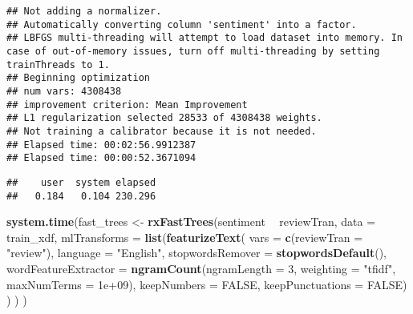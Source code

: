 \documentclass[]{book}
\newenvironment{Shaded}{\begin{snugshade}}{\end{snugshade}}
\newcommand{\KeywordTok}[1]{\textcolor[rgb]{0.13,0.29,0.53}{\textbf{#1}}}
\newcommand{\DataTypeTok}[1]{\textcolor[rgb]{0.13,0.29,0.53}{#1}}
\newcommand{\DecValTok}[1]{\textcolor[rgb]{0.00,0.00,0.81}{#1}}
\newcommand{\FloatTok}[1]{\textcolor[rgb]{0.00,0.00,0.81}{#1}}
\newcommand{\StringTok}[1]{\textcolor[rgb]{0.31,0.60,0.02}{#1}}
\newcommand{\OtherTok}[1]{\textcolor[rgb]{0.56,0.35,0.01}{#1}}
\newcommand{\OperatorTok}[1]{\textcolor[rgb]{0.81,0.36,0.00}{\textbf{#1}}}
\newcommand{\NormalTok}[1]{#1}
\theoremstyle{definition}
\theoremstyle{definition}
\theoremstyle{definition}
\theoremstyle{remark}
\begin{document}
\begin{verbatim}
## Not adding a normalizer.
## Automatically converting column 'sentiment' into a factor.
## LBFGS multi-threading will attempt to load dataset into memory. In case of out-of-memory issues, turn off multi-threading by setting trainThreads to 1.
## Beginning optimization
## num vars: 4308438
## improvement criterion: Mean Improvement
## L1 regularization selected 28533 of 4308438 weights.
## Not training a calibrator because it is not needed.
## Elapsed time: 00:02:56.9912387
## Elapsed time: 00:00:52.3671094
\end{verbatim}

\begin{verbatim}
##    user  system elapsed 
##   0.184   0.104 230.296
\end{verbatim}

\begin{Shaded}
\begin{Highlighting}[]
\KeywordTok{system.time}\NormalTok{(fast_trees <-}\StringTok{ }\KeywordTok{rxFastTrees}\NormalTok{(sentiment }\OperatorTok{~}\StringTok{ }\NormalTok{reviewTran,}
                                       \DataTypeTok{data =}\NormalTok{ train_xdf,}
                                       \DataTypeTok{mlTransforms =} 
                                                  \KeywordTok{list}\NormalTok{(}\KeywordTok{featurizeText}\NormalTok{(}
                                                    \DataTypeTok{vars =} \KeywordTok{c}\NormalTok{(}\DataTypeTok{reviewTran =} \StringTok{"review"}\NormalTok{),}
                                                    \DataTypeTok{language =} \StringTok{"English"}\NormalTok{,}
                                                    \DataTypeTok{stopwordsRemover =} \KeywordTok{stopwordsDefault}\NormalTok{(),}
                                                    \DataTypeTok{wordFeatureExtractor =} 
                                                      \KeywordTok{ngramCount}\NormalTok{(}\DataTypeTok{ngramLength =} \DecValTok{3}\NormalTok{,}
                                                                 \DataTypeTok{weighting =} \StringTok{"tfidf"}\NormalTok{,}
                                                                 \DataTypeTok{maxNumTerms =} \FloatTok{1e+09}\NormalTok{),}
                                                    \DataTypeTok{keepNumbers =} \OtherTok{FALSE}\NormalTok{,}
                                                    \DataTypeTok{keepPunctuations =} \OtherTok{FALSE}\NormalTok{)}
\NormalTok{                                                    )}
\NormalTok{                                      )}
\NormalTok{            )}
\end{Highlighting}
\end{Shaded}
\end{document}

